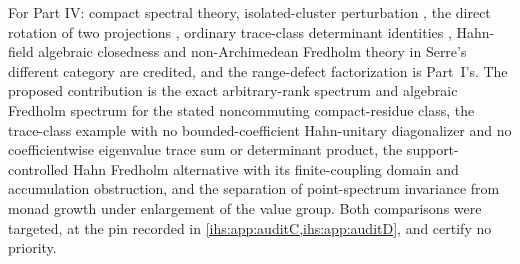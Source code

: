 \documentclass[11pt,a4paper]{article}
\numberwithin{equation}{section}
\theoremstyle{definition}
\theoremstyle{remark}
\begin{document}
For Part IV: compact spectral theory, isolated-cluster perturbation
\cite{Kato}, the direct rotation of two projections \cite{SimonProjections},
ordinary trace-class determinant identities \cite{Bornemann}, Hahn-field
algebraic closedness \cite{Poonen} and non-Archimedean Fredholm theory in
Serre's different category \cite{Serre} are credited, and the range-defect
factorization is Part~I's. The proposed contribution is the exact
arbitrary-rank spectrum and algebraic Fredholm spectrum for the stated
noncommuting compact-residue class, the trace-class example with no
bounded-coefficient Hahn-unitary diagonalizer and no coefficientwise
eigenvalue trace sum or determinant product, the support-controlled Hahn
Fredholm alternative with its finite-coupling domain and accumulation
obstruction, and the separation of point-spectrum invariance from monad
growth under enlargement of the value group. Both comparisons were targeted,
at the pin recorded in \cref{ihs:app:auditC,ihs:app:auditD}, and certify no
priority.
\end{document}
